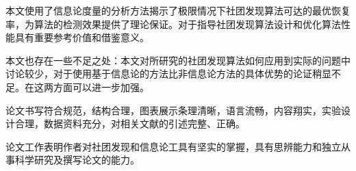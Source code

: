 
\begin{comments}
    本文使用了信息论度量的分析方法揭示了极限情况下社团发现算法可达的最优恢复率，为算法的检测效果提供了理论保证。对于指导社团发现算法设计和优化算法性能具有重要参考价值和借鉴意义。

    本文也存在一些不足之处：本文对所研究的社团发现算法如何应用到实际的问题中讨论较少，对于使用基于信息论的方法比非信息论方法的具体优势的论证稍显不足。在这两方面可以进一步加强。
    
    论文书写符合规范，结构合理，图表展示条理清晰，语言流畅，内容翔实，实验设计合理，数据资料充分，对相关文献的引述完整、正确。
    
    论文工作表明作者对社团发现和信息论工具有坚实的掌握，具有思辨能力和独立从事科学研究及撰写论文的能力。
\end{comments}
